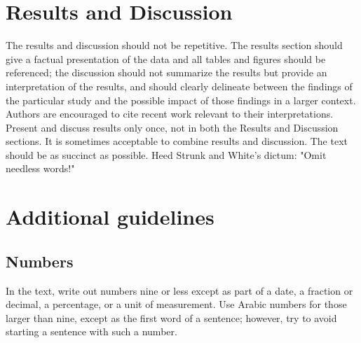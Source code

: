 \documentclass[9pt,twocolumn,twoside]{g3_article/gsag3jnl}
\begin{document}
%

\section*{Results and Discussion}

The results and discussion should not be repetitive. The results section should give a factual 
presentation of the data and all tables and figures should be referenced; the discussion 
should not summarize the results but provide an interpretation of the results, and should 
clearly delineate between the findings of the particular study and the possible impact 
of those findings in a larger context. Authors are encouraged to cite recent work 
relevant to their interpretations. Present and discuss results only once, not in 
both the Results and Discussion sections. It is sometimes acceptable to combine 
results and discussion. The text should be as succinct as possible. 
Heed Strunk and White's dictum: "Omit needless words!"

\section*{Additional guidelines}

    \subsection*{Numbers} In the text, write out numbers nine or less except as part of a date, a fraction or decimal, 
                          a percentage, or a unit of measurement. Use Arabic numbers for those larger than nine, 
                          except as the first word of a sentence; however, try to avoid starting a sentence with such a number.
\end{document}
